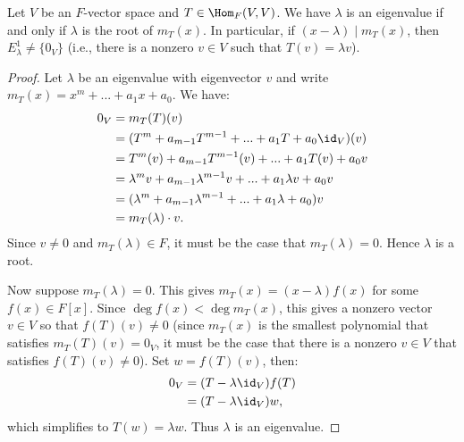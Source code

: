     \begin{theorem}
        Let $V$ be an $F$-vector space and $T \in \Hom_F{(V,V)}$. We have $\lambda$ is an eigenvalue if and only if $\lambda$ is the root of $m_T(x)$. In particular, if $(x-\lambda) \mid m_T(x)$, then $E_\lambda^1 \neq \{0_V\}$ (i.e., there is a nonzero $v \in V$ such that $T(v) = \lambda v$).
    \end{theorem}
        \begin{proof}
            Let $\lambda$ be an eigenvalue with eigenvector $v$ and write $m_T(x) = x^m + ... + a_1 x + a_0$. We have:
                \begin{equation*}
                \begin{split}
                    0_V
                    & = m_T(T)(v) \\
                    & = (T^m + a_{m-1}T^{m-1} + ... + a_1 T + a_0 \id_V)(v) \\
                    & = T^m(v) + a_{m-1}T^{m-1}(v) + ... + a_1T(v) + a_0v \\
                    & = \lambda^m v + a_{m-1}\lambda^{m-1}v + ... + a_1 \lambda v + a_0 v \\
                    & = (\lambda^m  + a_{m-1}\lambda^{m-1} + ... + a_1 \lambda  + a_0)v \\
                    & = m_T(\lambda)\cdot v.
                \end{split}
                \end{equation*}
            Since $v \neq 0$ and $m_T(\lambda) \in F$, it must be the case that $m_T(\lambda) = 0$. Hence $\lambda$ is a root.

            Now suppose $m_T(\lambda) = 0$. This gives $m_T(x) = (x-\lambda)f(x)$ for some $f(x) \in F[x]$. Since $\deg{f(x)} < \deg{m_T(x)}$, this gives a nonzero vector $v \in V$ so that $f(T)(v) \neq 0$ (since $m_T(x)$ is the smallest polynomial that satisfies $m_T(T)(v) = 0_V$, it must be the case that there is a nonzero $v \in V$ that satisfies $f(T)(v) \neq 0$). Set $w = f(T)(v)$, then:
                \begin{equation*}
                \begin{split}
                    0_V
                    & = (T-\lambda \id_V)f(T) \\
                    & = (T - \lambda \id_V)w,
                \end{split}
                \end{equation*}
            which simplifies to $T(w) = \lambda w$. Thus $\lambda$ is an eigenvalue.
        \end{proof}

